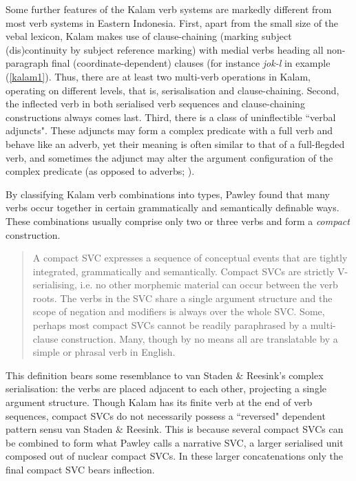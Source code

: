 Some further features of the Kalam verb systems are markedly different from most verb systems in Eastern Indonesia. First, apart from the small size of the vebal lexicon, Kalam makes use of clause-chaining (marking subject (dis)continuity by subject reference marking) with medial verbs heading all non-paragraph final (coordinate-dependent) clauses (for instance \textit{jok-l} in example (\ref{kalam1}). Thus, there are at least two multi-verb operations in Kalam, operating on different levels, that is, serisalisation and clause-chaining. Second, the inflected verb in both serialised verb sequences and clause-chaining constructions always comes last. Third, there is a class of uninflectible ``verbal adjuncts". These adjuncts may form a complex predicate with a full verb and behave like an adverb, yet their meaning is often similar to that of a full-flegded verb, and sometimes the adjunct may alter the argument configuration of the complex predicate (as opposed to adverbs; \citealt[177]{pawley2008serial}).

By classifying Kalam verb combinations into types, Pawley found that many verbs occur together in certain grammatically and semantically definable ways. These combinations usually comprise only two or three verbs and form a \textit{compact} construction. 

\begin{quote}A compact SVC expresses a sequence of conceptual events that are tightly integrated, grammatically and semantically. Compact SVCs are strictly V-serialising, i.e. no other morphemic material can occur between the verb roots. The verbs in the SVC share a single argument structure and the scope of negation and modifiers is always over the whole SVC. Some, perhaps most compact SVCs cannot be readily paraphrased by a multi-clause construction. Many, though by no means all are translatable by a simple or phrasal verb in English. \citep[172f.]{pawley2008serial}\end{quote}

This definition bears some resemblance to van Staden \& Reesink's complex serialisation: the verbs are placed adjacent to each other, projecting a single argument structure. Though Kalam has its finite verb at the end of verb sequences, compact SVCs do not necessarily possess a ``reversed" dependent pattern sensu van Staden \& Reesink. This is because several compact SVCs can be combined to form what Pawley calls a narrative SVC, a larger serialised unit composed out of nuclear compact SVCs. In these larger concatenations only the final compact SVC bears inflection.

